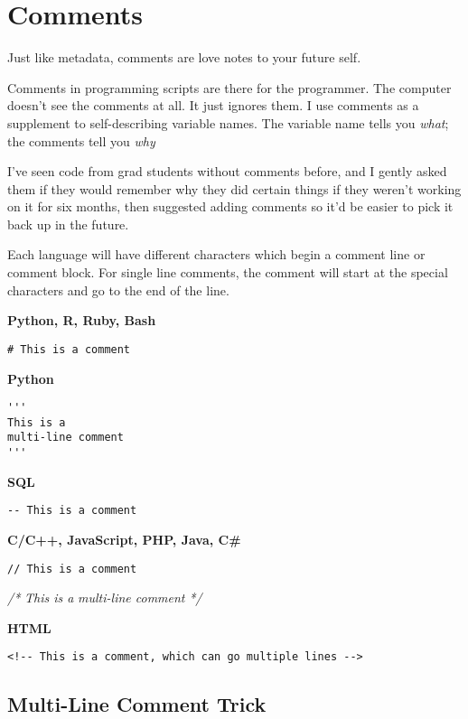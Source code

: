 \documentclass[
]{book}
\newenvironment{Shaded}{\begin{snugshade}}{\end{snugshade}}
\newcommand{\CommentTok}[1]{\textcolor[rgb]{0.56,0.35,0.01}{\textit{#1}}}
\begin{document}
\section{Comments}\label{comments}

Just like metadata, comments are love notes to your future self.

Comments in programming scripts are there for the programmer. The computer doesn't see the comments at all. It just ignores them. I use comments as a supplement to self-describing variable names. The variable name tells you \emph{what}; the comments tell you \emph{why}

I've seen code from grad students without comments before, and I gently asked them if they would remember why they did certain things if they weren't working on it for six months, then suggested adding comments so it'd be easier to pick it back up in the future.

Each language will have different characters which begin a comment line or comment block. For single line comments, the comment will start at the special characters and go to the end of the line.

\textbf{Python, R, Ruby, Bash}

\texttt{\#\ This\ is\ a\ comment}

\textbf{Python}

\begin{verbatim}
'''
This is a 
multi-line comment
'''
\end{verbatim}

\textbf{SQL}

\texttt{-\/-\ This\ is\ a\ comment}

\textbf{C/C++, JavaScript, PHP, Java, C\#}

\texttt{//\ This\ is\ a\ comment}

\begin{Shaded}
\begin{Highlighting}[]
\CommentTok{/* }
\CommentTok{This is a }
\CommentTok{multi{-}line comment }
\CommentTok{*/}
\end{Highlighting}
\end{Shaded}

\textbf{HTML}

\texttt{\textless{}!-\/-\ This\ is\ a\ comment,\ which\ can\ go\ multiple\ lines\ -\/-\textgreater{}}

\subsection{Multi-Line Comment Trick}\label{multi-line-comment-trick}
\end{document}
